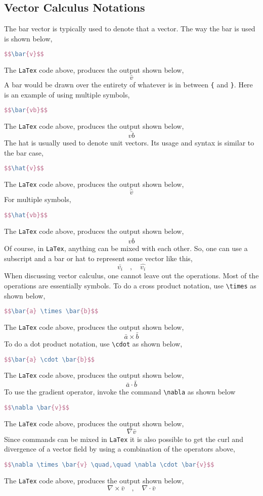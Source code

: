 \documentclass[a4paper, 12pt]{report}
\begin{document}
\begin{center}
\subsection{Vector Calculus Notations}
\begin{comment}
\end{comment}
The bar vector is typically used to denote that a vector. The way the bar is used is shown below,
\begin{lstlisting}[language=tex]
$$\bar{v}$$
\end{lstlisting}
The \texttt{LaTex} code above, produces the output shown below,
$$\bar{v}$$
A bar would be drawn over the entirety of whatever is in between \texttt{\{} and \texttt{\}}. Here is an example of using multiple symbols,
\begin{lstlisting}[language=tex]
$$\bar{vb}$$
\end{lstlisting}
The \texttt{LaTex} code above, produces the output shown below,
$$\bar{vb}$$
The hat is usually used to denote unit vectors. Its usage and syntax is similar to the bar case,
\begin{lstlisting}[language=tex]
$$\hat{v}$$
\end{lstlisting}
The \texttt{LaTex} code above, produces the output shown below,
$$\hat{v}$$
For multiple symbols,
\begin{lstlisting}[language=tex]
$$\hat{vb}$$
\end{lstlisting}
The \texttt{LaTex} code above, produces the output shown below,
$$\hat{vb}$$
Of course, in \texttt{LaTex}, anything can be mixed with each other. So, one can use a subscript and a bar or hat to represent some vector like this,
$$\bar{v_{i}} \quad,\quad \hat{v_{i}}$$
When discussing vector calculus, one cannot leave out the operations. Most of the operations are essentially symbols. To do a cross product notation, use \texttt{\textbackslash times} as shown below,
\begin{lstlisting}[language=tex]
$$\bar{a} \times \bar{b}$$
\end{lstlisting}
The \texttt{LaTex} code above, produces the output shown below,
$$\bar{a} \times \bar{b}$$
To do a dot product notation, use \texttt{\textbackslash cdot} as shown below,
\begin{lstlisting}[language=tex]
$$\bar{a} \cdot \bar{b}$$
\end{lstlisting}
The \texttt{LaTex} code above, produces the output shown below,
$$\bar{a} \cdot \bar{b}$$
To use the gradient operator, invoke the command \texttt{\textbackslash nabla} as shown below
\begin{lstlisting}[language=tex]
$$\nabla \bar{v}$$
\end{lstlisting}
The \texttt{LaTex} code above, produces the output shown below,
$$\nabla \bar{v}$$
Since commands can be mixed in \texttt{LaTex} it is also possible to get the curl and divergence of a vector field by using a combination of the operators above,
\begin{lstlisting}[language=tex]
$$\nabla \times \bar{v} \quad,\quad \nabla \cdot \bar{v}$$
\end{lstlisting}
The \texttt{LaTex} code above, produces the output shown below,
$$\nabla \times \bar{v} \quad,\quad \nabla \cdot \bar{v}$$


\end{center}
\end{document}
